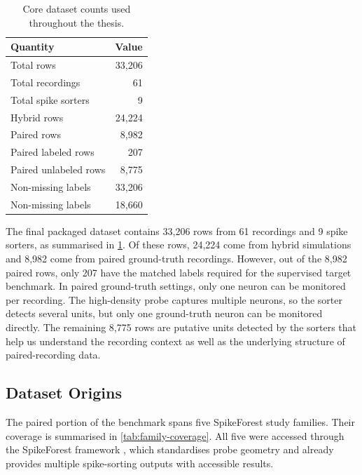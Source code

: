 \begin{table}[H]
    \centering
    \caption{Core dataset counts used throughout the thesis.}
    \label{tab:dataset-summary}
    \begin{tabular}{lr}
        \toprule
        Quantity & Value \\
        \midrule
        Total rows & 33,206 \\
        Total recordings & 61 \\
        Total spike sorters & 9 \\
        Hybrid rows & 24,224 \\
        Paired rows & 8,982 \\
        Paired labeled rows & 207 \\
        Paired unlabeled rows & 8,775 \\
        Non-missing \fpos{} labels & 33,206 \\
        Non-missing \fmiss{} labels & 18,660 \\
        \bottomrule
    \end{tabular}
\end{table}

The final packaged dataset contains 33,206 rows from 61 recordings and 9 spike sorters, as summarised in \cref{tab:dataset-summary}. Of these rows, 24,224 come from hybrid simulations and 8,982 come from paired ground-truth recordings. However, out of the 8,982 paired rows, only 207 have the matched labels required for the supervised target benchmark. In paired ground-truth settings, only one neuron can be monitored per recording. The high-density probe captures multiple neurons, so the sorter detects several units, but only one ground-truth neuron can be monitored directly. The remaining 8,775 rows are putative units detected by the sorters that help us understand the recording context as well as the underlying structure of paired-recording data.

\subsection{Dataset Origins}

The paired portion of the benchmark spans five SpikeForest study families. Their coverage is summarised in \cref{tab:family-coverage}. All five were accessed through the SpikeForest framework \parencite{Magland2020}, which standardises probe geometry and already provides multiple spike-sorting outputs with accessible results.

